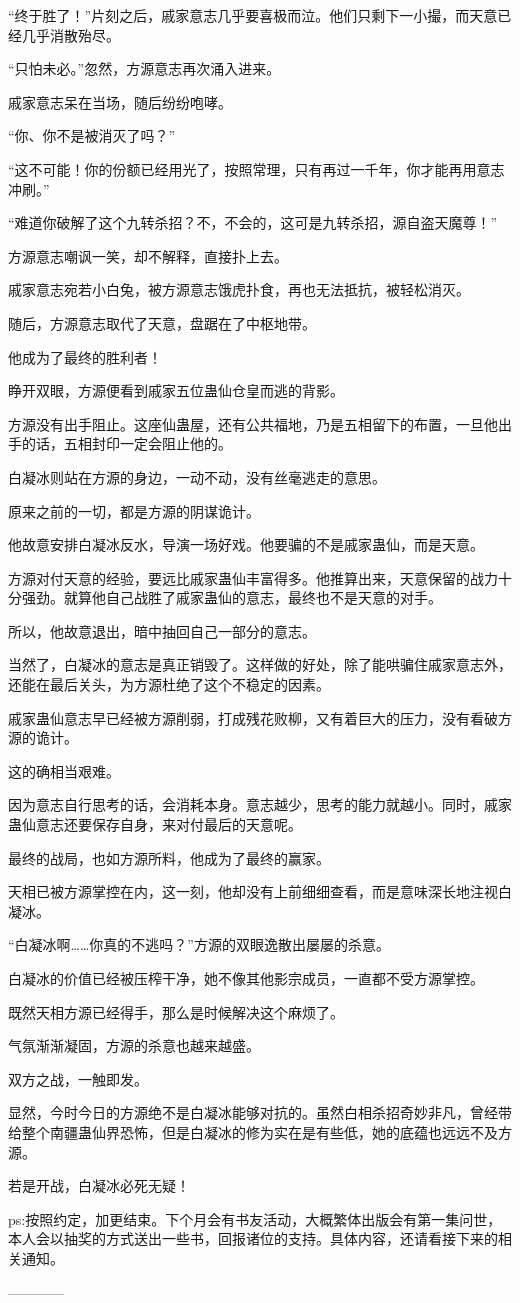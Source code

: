\begin{this_body}
“终于胜了！”片刻之后，戚家意志几乎要喜极而泣。他们只剩下一小撮，而天意已经几乎消散殆尽。

“只怕未必。”忽然，方源意志再次涌入进来。

戚家意志呆在当场，随后纷纷咆哮。

“你、你不是被消灭了吗？”

“这不可能！你的份额已经用光了，按照常理，只有再过一千年，你才能再用意志冲刷。”

“难道你破解了这个九转杀招？不，不会的，这可是九转杀招，源自盗天魔尊！”

方源意志嘲讽一笑，却不解释，直接扑上去。

戚家意志宛若小白兔，被方源意志饿虎扑食，再也无法抵抗，被轻松消灭。

随后，方源意志取代了天意，盘踞在了中枢地带。

他成为了最终的胜利者！

睁开双眼，方源便看到戚家五位蛊仙仓皇而逃的背影。

方源没有出手阻止。这座仙蛊屋，还有公共福地，乃是五相留下的布置，一旦他出手的话，五相封印一定会阻止他的。

白凝冰则站在方源的身边，一动不动，没有丝毫逃走的意思。

原来之前的一切，都是方源的阴谋诡计。

他故意安排白凝冰反水，导演一场好戏。他要骗的不是戚家蛊仙，而是天意。

方源对付天意的经验，要远比戚家蛊仙丰富得多。他推算出来，天意保留的战力十分强劲。就算他自己战胜了戚家蛊仙的意志，最终也不是天意的对手。

所以，他故意退出，暗中抽回自己一部分的意志。

当然了，白凝冰的意志是真正销毁了。这样做的好处，除了能哄骗住戚家意志外，还能在最后关头，为方源杜绝了这个不稳定的因素。

戚家蛊仙意志早已经被方源削弱，打成残花败柳，又有着巨大的压力，没有看破方源的诡计。

这的确相当艰难。

因为意志自行思考的话，会消耗本身。意志越少，思考的能力就越小。同时，戚家蛊仙意志还要保存自身，来对付最后的天意呢。

最终的战局，也如方源所料，他成为了最终的赢家。

天相已被方源掌控在内，这一刻，他却没有上前细细查看，而是意味深长地注视白凝冰。

“白凝冰啊……你真的不逃吗？”方源的双眼逸散出屡屡的杀意。

白凝冰的价值已经被压榨干净，她不像其他影宗成员，一直都不受方源掌控。

既然天相方源已经得手，那么是时候解决这个麻烦了。

气氛渐渐凝固，方源的杀意也越来越盛。

双方之战，一触即发。

显然，今时今日的方源绝不是白凝冰能够对抗的。虽然白相杀招奇妙非凡，曾经带给整个南疆蛊仙界恐怖，但是白凝冰的修为实在是有些低，她的底蕴也远远不及方源。

若是开战，白凝冰必死无疑！

ps:按照约定，加更结束。下个月会有书友活动，大概繁体出版会有第一集问世，本人会以抽奖的方式送出一些书，回报诸位的支持。具体内容，还请看接下来的相关通知。

------------

\end{this_body}

